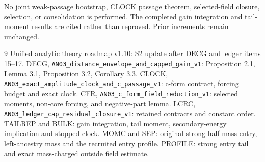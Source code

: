 \documentclass[11pt]{article}
\theoremstyle{remark}\newtheorem{remark}[proposition]{Remark}
\begin{document}
No joint weak-passage bootstrap, CLOCK passage theorem,
selected-field closure, selection, or consolidation is performed.
The completed gain integration and tail-moment results are
cited rather than reproved. Prior increments remain unchanged.

\begin{thebibliography}{9}\small
{} Unified analytic theory roadmap v1.10:
S2 update after DECG and ledger items 15--17.
 DECG, \texttt{AN03\_distance\_envelope\_and\_capped\_gain\_v1}:
Proposition 2.1, Lemma 3.1, Proposition 3.2, Corollary 3.3.
 CLOCK, \texttt{AN03\_exact\_amplitude\_clock\_and\_c\_passage\_v1}:
c-form contract, forcing budget and exact clock.
 CFR, \texttt{AN03\_c\_form\_field\_reduction\_v1}:
selected moments, non-core forcing, and negative-part lemma.
 LCRC, \texttt{AN03\_ledger\_cap\_residual\_closure\_v1}:
retained contracts and constant order.
 TAILREP and BULK: gain integration, tail moment,
secondary-energy implication and stopped clock.
 MOMC and SEP: original strong half-mass entry,
left-ancestry mass and the recruited entry profile.
 PROFILE: strong entry tail and exact
mass-charged outside field estimate.
\end{thebibliography}
\end{document}
